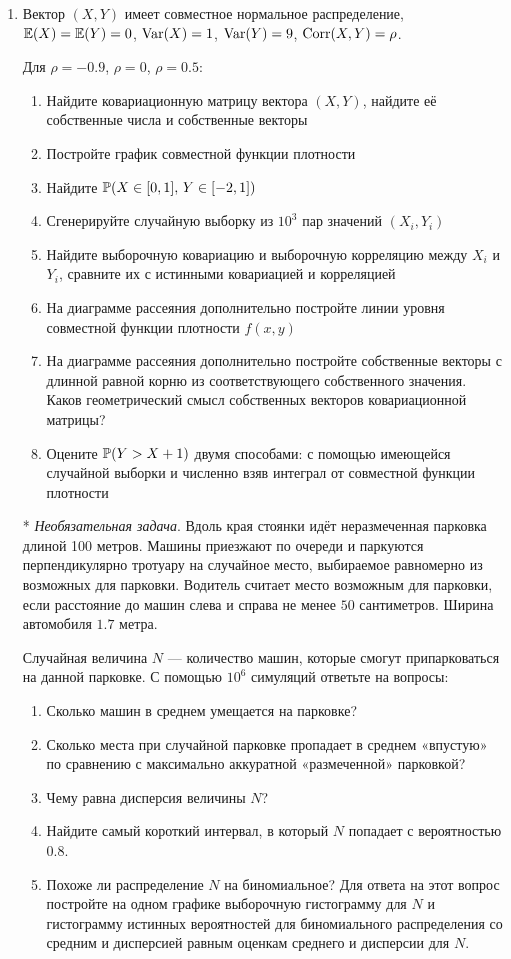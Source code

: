 \documentclass[12pt, a4paper]{article}\usepackage[]{graphicx}\usepackage[]{color}
\begin{document}
\begin{enumerate}
					\item Вектор $(X,Y)$ имеет совместное нормальное распределение, $\E(X)=\E(Y)=0$, $\Var(X)=1$, $\Var(Y)=9$, $\Corr(X,Y)=\rho$.

					Для $\rho=-0.9$, $\rho=0$, $\rho=0.5$:

					\begin{enumerate}
						\item Найдите ковариационную матрицу вектора  $(X,Y)$, найдите её собственные числа и собственные векторы
						\item Постройте график совместной функции плотности
						\item Найдите $\P(X\in [0,1], \, Y\in [-2,1] )$
						\item Сгенерируйте случайную выборку из $10^3$ пар значений $(X_i,Y_i)$
						\item Найдите выборочную ковариацию и выборочную корреляцию между $X_i$ и $Y_i$, сравните их с истинными ковариацией и корреляцией
						\item На диаграмме рассеяния дополнительно постройте линии уровня совместной функции плотности $f(x,y)$
						\item На диаграмме рассеяния дополнительно постройте собственные векторы с длинной равной корню из соответствующего собственного значения. Каков геометрический смысл собственных векторов ковариационной матрицы?
						\item Оцените $\P(Y>X+1)$ двумя способами: с помощью имеющейся случайной выборки и численно взяв интеграл от совместной функции плотности
					\end{enumerate}


					\item[*] \textit{Необязательная задача}. Вдоль края стоянки идёт неразмеченная парковка длиной 100 метров. Машины приезжают по очереди и паркуются перпендикулярно тротуару на случайное место, выбираемое равномерно из возможных для парковки. Водитель считает место возможным для парковки, если расстояние до машин слева и справа не менее $50$ сантиметров. Ширина автомобиля $1.7$ метра.

					Случайная величина $N$ — количество машин, которые смогут припарковаться на данной парковке. С помощью $10^6$ симуляций ответьте на вопросы:
					\begin{enumerate}
						\item Сколько машин в среднем умещается на парковке?
						\item Сколько места при случайной парковке пропадает в среднем «впустую» по сравнению с максимально аккуратной «размеченной» парковкой?
						\item Чему равна дисперсия величины $N$?
						\item Найдите самый короткий интервал, в который $N$ попадает с вероятностью $0.8$.
						\item Похоже ли распределение $N$ на биномиальное? Для ответа на этот вопрос постройте на одном графике выборочную гистограмму для $N$ и гистограмму истинных вероятностей для биномиального распределения со средним и дисперсией равным оценкам среднего и дисперсии для $N$.
					\end{enumerate}



\end{enumerate}
\end{document}
